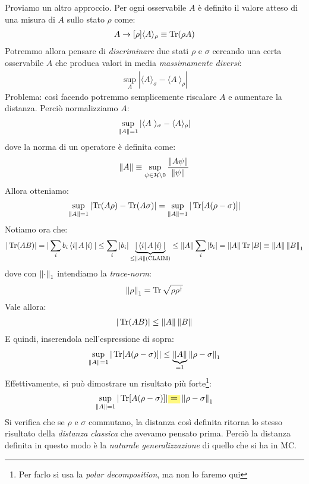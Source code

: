 \documentclass[../../InformazioneQuantistica.tex]{subfiles}
\begin{document}
Proviamo un altro approccio. Per ogni osservabile $A$ è definito il valore atteso di una misura di $A$ sullo stato $\rho$ come:
\begin{align*}
A \xrightarrow{}[\rho] \langle A \rangle_\rho \equiv \operatorname{Tr}(\rho A)
\end{align*}
Potremmo allora pensare di \textit{discriminare} due stati $\rho$ e $\sigma$ cercando una certa osservabile $A$ che produca valori in media \textit{massimamente diversi}:
\begin{align*}
\sup_A |\langle A \rangle_\sigma - \langle A\ \rangle _\rho|
\end{align*}
Problema: così facendo potremmo semplicemente riscalare $A$ e aumentare la distanza. Perciò normalizziamo $A$:
\begin{align*}
\sup_{\left\lVert A\right\rVert=1} |\langle A\ \rangle_\sigma -\langle A \rangle_\rho|
\end{align*}
dove la norma di un operatore è definita come:
\begin{align*}
\left\lVert A\right\rVert \equiv \sup_{\psi \in \mathcal{H} \setminus 0} \frac{\left\lVert A \psi\right\rVert}{\left\lVert\psi\right\rVert}
\end{align*}
Allora otteniamo:
\begin{align*}
\sup_{\left\lVert A\right\rVert=1} \left| \operatorname{Tr}(A\rho) - \operatorname{Tr}(A\sigma) \right| = \sup_{\left\lVert A\right\rVert=1} |\operatorname{Tr}[A(\rho-\sigma)]|
\end{align*}
Notiamo ora che:
\begin{align*}
|\operatorname{Tr}(AB)| = |\sum_i b_i \Bra{i}A \Ket{i}| \leq \sum_i |b_i| \underbrace{|\Bra{i}A \Ket{i}|}_{\leq \left\lVert A\right\rVert (\mathrm{CLAIM})} \leq \left\lVert A\right\rVert \sum_i |b_i| = \left\lVert A\right\rVert \operatorname{Tr} |B| \equiv \left\lVert A\right\rVert \left\lVert B\right\rVert_1
\end{align*}
dove con $\left\lVert\cdot\right\rVert_1$ intendiamo la \textit{trace-norm}:
\begin{align*}
\left\lVert\rho\right\rVert_1 = \operatorname{Tr}\sqrt{\rho \rho^\dag}
\end{align*} Vale allora:
\begin{align*}
|\operatorname{Tr}(AB)|\leq \left\lVert A\right\rVert\left\lVert B\right\rVert
\end{align*}
E quindi, inserendola nell'espressione di sopra:
\begin{align*}
\sup_{\left\lVert A\right\rVert=1} |\operatorname{Tr}[A(\rho-\sigma)]| \leq \underbrace{\left\lVert A\right\rVert}_{=1}\left\lVert\rho-\sigma\right\rVert_1
\end{align*}
Effettivamente, si può dimostrare un risultato più forte\footnote{Per farlo si usa la \textit{polar decomposition}, ma non lo faremo qui}:
\begin{align*}
\sup_{\norm{A}=1} |\op{Tr}[A(\rho-\sigma)]| \hlc{Yellow}{\bm{=}} \norm{\rho-\sigma}_1
\end{align*}
Si verifica che se $\rho$ e $\sigma$ commutano, la distanza così definita ritorna lo stesso risultato della \textit{distanza classica} che avevamo pensato prima. Perciò la distanza definita in questo modo è la \textit{naturale generalizzazione} di quello che si ha in MC.\\
\end{document}
